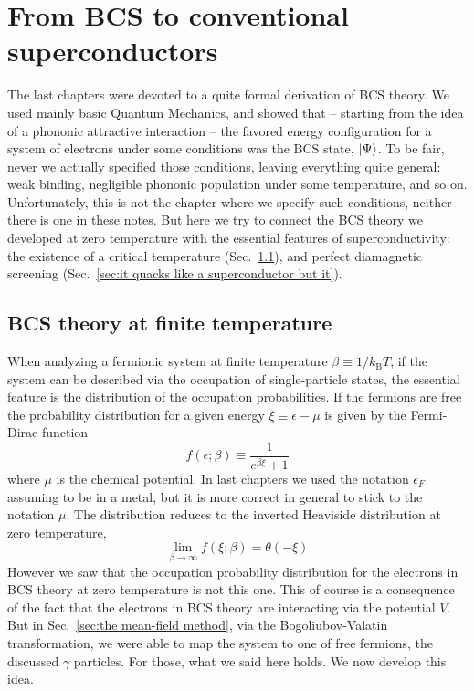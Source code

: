 \chapter{From BCS to conventional superconductors}\chaptertoc{}\label{chap:from bcs to conventional superconductors}

The last chapters were devoted to a quite formal derivation of BCS theory. We used mainly basic Quantum Mechanics, and showed that -- starting from the idea of a phononic attractive interaction -- the favored energy configuration for a system of electrons under some conditions was the BCS state, $\ket{\Psi}$. To be fair, never we actually specified those conditions, leaving everything quite general: weak binding, negligible phononic population under some temperature, and so on. Unfortunately, this is not the chapter where we specify such conditions, neither there is one in these notes. But here we try to connect the BCS theory we developed at zero temperature with the essential features of superconductivity: the existence of a critical temperature (Sec.~\ref{sec:bcs theory at finite temperature}), and perfect diamagnetic screening (Sec.~\ref{sec:it quacks like a superconductor but it}).

\section{BCS theory at finite temperature}\label{sec:bcs theory at finite temperature}

When analyzing a fermionic system at finite temperature $\beta \equiv 1/k_\mathrm{B} T$, if the system can be described via the occupation of single-particle states, the essential feature is the distribution of the occupation probabilities. If the fermions are free the probability distribution for a given energy $\xi\equiv\epsilon-\mu$ is given by the Fermi-Dirac function
\[
	f(\epsilon;\beta) \equiv \frac{1}{e^{\beta \xi} + 1}
\]
where $\mu$ is the chemical potential. In last chapters we used the notation $\epsilon_F$ assuming to be in a metal, but it is more correct in general to stick to the notation $\mu$. The distribution reduces to the inverted Heaviside distribution at zero temperature,
\[
	\lim_{\beta\to\infty} f(\xi;\beta) = \theta(-\xi)
\]
However we saw that the occupation probability distribution for the electrons in BCS theory at zero temperature is not this one. This of course is a consequence of the fact that the electrons in BCS theory are interacting via the potential $V$. But in Sec.~\ref{sec:the mean-field method}, via the Bogoliubov-Valatin transformation, we were able to map the system to one of free fermions, the discussed $\gamma$ particles. For those, what we said here holds. We now develop this idea.

